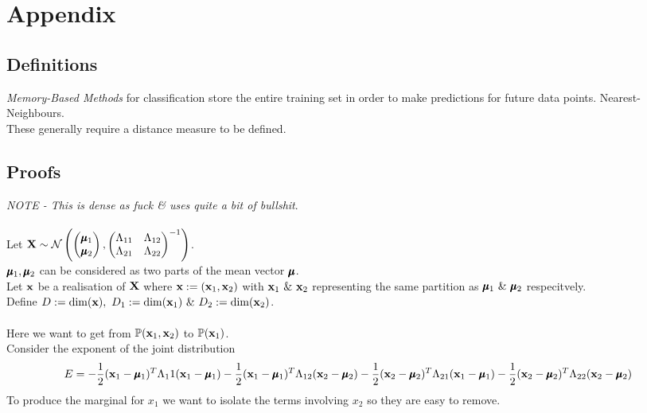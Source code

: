 \documentclass[11pt,a4paper]{article}
\begin{document}
\newpage
\setcounter{section}{-1}
\section{Appendix}

\subsection{Definitions}

\textit{Memory-Based Methods} for classification store the entire training set in order to make predictions for future data points. \eg Nearest-Neighbours.\\
\nb These generally require a distance measure to be defined.\\

\subsection{Proofs}
\textit{NOTE - This is dense as fuck \& uses quite a bit of bullshit}.\\
\\Let $\textbf{X}\sim\mathcal{N}\left(\begin{pmatrix}
\pmb{\mu}_1\\\pmb{\mu}_2
\end{pmatrix},\begin{pmatrix}
\Lambda_{11}&\Lambda_{12}\\
\Lambda_{21}&\Lambda_{22}
\end{pmatrix}^{-1}\right)$.\\
$\pmb{\mu}_1,\pmb{\mu}_2$ can be considered as two parts of the mean vector $\pmb{\mu}$.\\
Let $\textbf{x}$ be a realisation of $\textbf{X}$ where $\textbf{x}:=(\textbf{x}_1,\textbf{x}_2)$ with $\textbf{x}_1\ \&\ \textbf{x}_2$ representing the same partition as $\pmb{\mu}_1\ \&\ \pmb{\mu}_2$ respecitvely.\\
Define $D:=\mathrm{dim}(\x),\ D_1:=\mathrm{dim}(\x_1)\ \&\ D_2:=\mathrm{dim}(\x_2)$.\\
\\Here we want to get from $\mathbb{P}(\textbf{x}_1,\textbf{x}_2)$ to $\mathbb{P}(\textbf{x}_1)$.\\
Consider the exponent of the joint distribution
$$E=-\frac{1}{2}(\textbf{x}_1-\pmb{\mu}_1)^T\Lambda_11(\textbf{x}_1-\pmb{\mu}_1)-\frac{1}{2}(\textbf{x}_1-\pmb{\mu}_1)^T\Lambda_{12}(\textbf{x}_2-\pmb{\mu}_2)-\frac{1}{2}(\textbf{x}_2-\pmb{\mu}_2)^T\Lambda_{21}(\textbf{x}_1-\pmb{\mu}_1)-\frac{1}{2}(\textbf{x}_2-\pmb{\mu}_2)^T\Lambda_{22}(\textbf{x}_2-\pmb{\mu}_2)$$
To produce the marginal for $x_1$ we want to isolate the terms involving $x_2$ so they are easy to remove.
\end{document}
